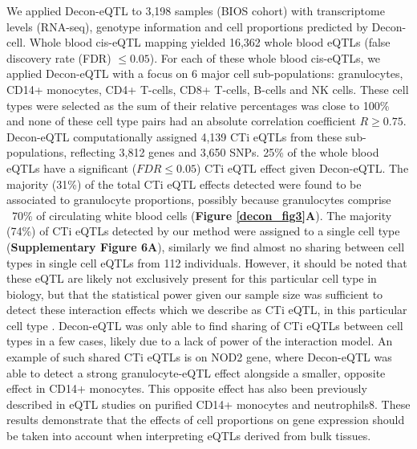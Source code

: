 We applied Decon-eQTL to 3,198 samples (BIOS cohort) with transcriptome levels (RNA-seq), genotype information and cell proportions predicted by Decon-cell. Whole blood cis-eQTL mapping yielded 16,362 whole blood eQTLs (false discovery rate (FDR) $\leq 0.05$). For each of these whole blood cis-eQTLs, we applied Decon-eQTL with a focus on 6 major cell sub-populations: granulocytes, CD14+ monocytes, CD4+ T-cells, CD8+ T-cells, B-cells and NK cells. These cell types were selected as the sum of their relative percentages was close to 100\% and none of these cell type pairs had an absolute correlation coefficient $R \geq 0.75$. Decon-eQTL computationally assigned 4,139 CTi eQTLs from these sub-populations, reflecting 3,812 genes and 3,650 SNPs. 25\% of the whole blood eQTLs have a significant ($FDR \leq 0.05$) CTi eQTL effect given Decon-eQTL. The majority (31\%) of the total CTi eQTL effects detected were found to be associated to granulocyte proportions, possibly because granulocytes comprise ~70\% of circulating white blood cells (\textbf{Figure \ref{decon_fig3}A}). The majority (74\%) of CTi eQTLs detected by our method were assigned to a single cell type (\textbf{Supplementary Figure 6A}), similarly we find almost no sharing between cell types in single cell eQTLs from 112 individuals. However, it should be noted that these eQTL are likely not exclusively present for this particular cell type in biology, but that the statistical power given our sample size was sufficient to detect these interaction effects which we describe as CTi eQTL, in this particular cell type . Decon-eQTL was only able to find sharing of CTi eQTLs between cell types in a few cases, likely due to a lack of power of the interaction model. An example of such shared CTi eQTLs is on NOD2 gene, where Decon-eQTL was able to detect a strong granulocyte-eQTL effect alongside a smaller, opposite effect in CD14+ monocytes. This opposite effect has also been previously described in eQTL studies on purified CD14+ monocytes and neutrophils8. These results demonstrate that the effects of cell proportions on gene expression should be taken into account when interpreting eQTLs derived from bulk tissues.

